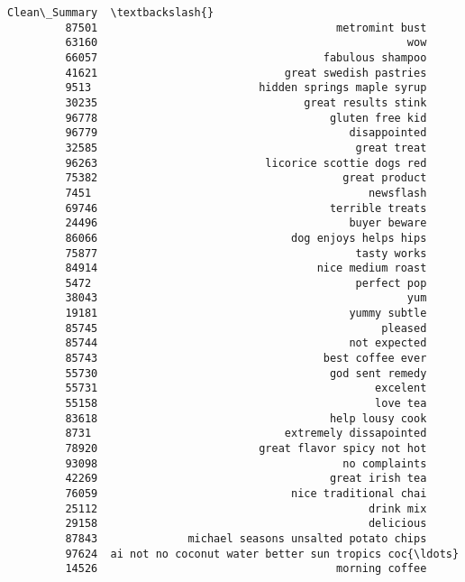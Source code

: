 \documentclass[11pt]{article}
\begin{document}
\begin{Verbatim}[commandchars=\\\{\}]
                                                    Clean\_Summary  \textbackslash{}
         87501                                     metromint bust   
         63160                                                wow   
         66057                                   fabulous shampoo   
         41621                             great swedish pastries   
         9513                          hidden springs maple syrup   
         30235                                great results stink   
         96778                                    gluten free kid   
         96779                                       disappointed   
         32585                                        great treat   
         96263                          licorice scottie dogs red   
         75382                                      great product   
         7451                                           newsflash   
         69746                                    terrible treats   
         24496                                       buyer beware   
         86066                              dog enjoys helps hips   
         75877                                        tasty works   
         84914                                  nice medium roast   
         5472                                         perfect pop   
         38043                                                yum   
         19181                                       yummy subtle   
         85745                                            pleased   
         85744                                       not expected   
         85743                                   best coffee ever   
         55730                                    god sent remedy   
         55731                                           excelent   
         55158                                           love tea   
         83618                                    help lousy cook   
         8731                              extremely dissapointed   
         78920                         great flavor spicy not hot   
         93098                                      no complaints   
         42269                                    great irish tea   
         76059                              nice traditional chai   
         25112                                          drink mix   
         29158                                          delicious   
         87843              michael seasons unsalted potato chips   
         97624  ai not no coconut water better sun tropics coc{\ldots}   
         14526                                     morning coffee   

\end{Verbatim}
\end{document}
